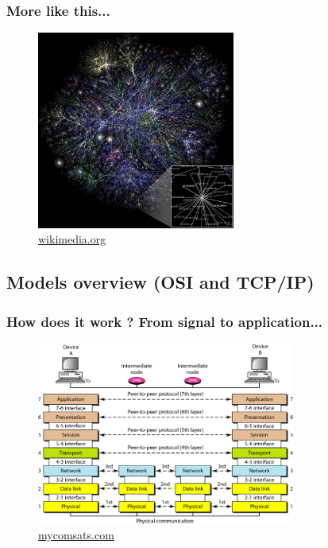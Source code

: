     \begin{frame}
    \frametitle{More like this...}
      \begin{figure}
    \includegraphics[height=6.5cm]{./imgs/map.jpg}
  \caption{\color{blue}\href{https://upload.wikimedia.org/wikipedia/commons/thumb/d/d2/Internet_map_1024.jpg/768px-Internet_map_1024.jpg}{wikimedia.org}}
  \label{fig:routing}
      \end{figure}
  \end{frame}

\subsection{Models overview (OSI and TCP/IP)}
  \begin{frame}
    \frametitle{How does it work ? From signal to application...}
    \begin{figure}[t]
      \centering
      \includegraphics[height=6cm]{./imgs/layers.png}
      \caption{\color{blue}\href{http://mycomsats.com/blogs/wp-content/uploads/2012/05/image.png}{mycomsats.com}}
      \label{fig:ntwks}
    \end{figure}
  \end{frame}
